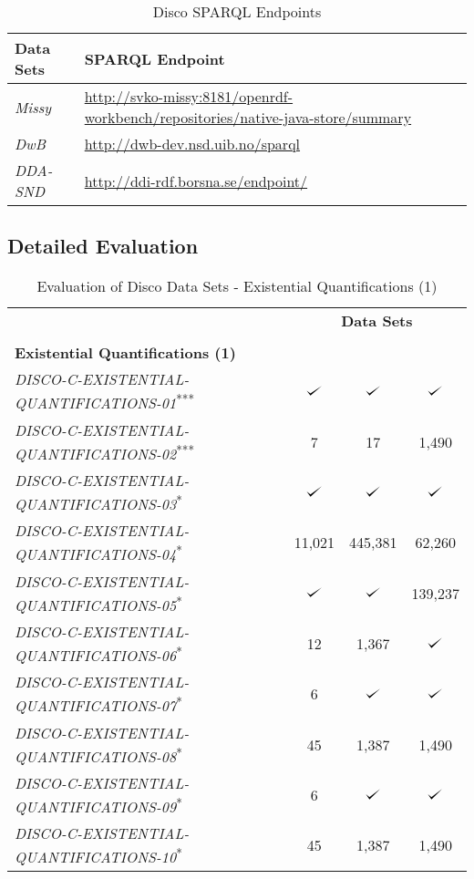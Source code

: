 \documentclass{llncs}
\def\checkmark{\tikz\fill[scale=0.4](0,.35) -- (.25,0) -- (1,.7) -- (.25,.15) -- cycle;}
\newcommand*\rot{\rotatebox{90}}
\begin{document}
\begin{table}[H]
	\centering
		\begin{tabular}{l|l}
      \textbf{Data Sets} & \textbf{SPARQL Endpoint} \\		
      \hline
      \emph{Missy} & \url{http://svko-missy:8181/openrdf-workbench/repositories/native-java-store/summary} \\
			\emph{DwB} & \url{http://dwb-dev.nsd.uib.no/sparql} \\
			\emph{DDA-SND} & \url{http://ddi-rdf.borsna.se/endpoint/} \\
		\end{tabular}
	\caption{Disco SPARQL Endpoints}
	\label{tab:disco-sparql-endpoints}
\end{table}

\subsection{Detailed Evaluation}

\begin{table}[H]
    \begin{center}
    \begin{tabular}{@{}lccc@{}}
           & \multicolumn{3}{c}{\textbf{Data Sets}}
    \\  \cmidrule{2-4}
    \\       \textbf{Existential Quantifications (1)}
           & \rot{\emph{Missy}}
           & \rot{\emph{DwB}}
           & \rot{\emph{DDA-SND}}
    \\ \midrule
    \emph{DISCO-C-EXISTENTIAL-QUANTIFICATIONS-01}\textsuperscript{***} & $\checkmark$ & $\checkmark$ & $\checkmark$ \\
		\emph{DISCO-C-EXISTENTIAL-QUANTIFICATIONS-02}\textsuperscript{***} & 7 & 17 & 1,490 \\
		\emph{DISCO-C-EXISTENTIAL-QUANTIFICATIONS-03}\textsuperscript{*} & $\checkmark$ & $\checkmark$ & $\checkmark$ \\
		\emph{DISCO-C-EXISTENTIAL-QUANTIFICATIONS-04}\textsuperscript{*} & 11,021 & 445,381 & 62,260 \\
		\emph{DISCO-C-EXISTENTIAL-QUANTIFICATIONS-05}\textsuperscript{*} & $\checkmark$ & $\checkmark$ & 139,237 \\
		\emph{DISCO-C-EXISTENTIAL-QUANTIFICATIONS-06}\textsuperscript{*} & 12 & 1,367 & $\checkmark$ \\
		\emph{DISCO-C-EXISTENTIAL-QUANTIFICATIONS-07}\textsuperscript{*} & 6 & $\checkmark$ & $\checkmark$ \\
		\emph{DISCO-C-EXISTENTIAL-QUANTIFICATIONS-08}\textsuperscript{*} & 45 & 1,387 & 1,490 \\
		\emph{DISCO-C-EXISTENTIAL-QUANTIFICATIONS-09}\textsuperscript{*} & 6 & $\checkmark$ & $\checkmark$ \\
		\emph{DISCO-C-EXISTENTIAL-QUANTIFICATIONS-10}\textsuperscript{*} & 45 & 1,387 & 1,490 \\
    \bottomrule
    \end{tabular}
    \caption{Evaluation of Disco Data Sets - Existential Quantifications (1)}
		\label{tab:evaluation-disco-existential-quantifications-1}
    \end{center}
\end{table}
\end{document}
